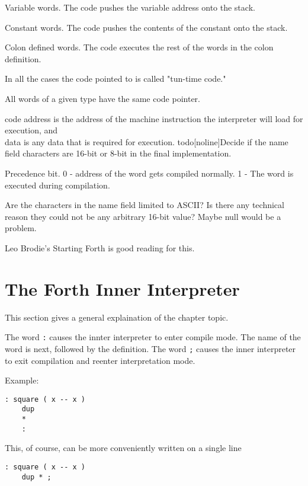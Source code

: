 Variable words. The code pushes the variable address onto the stack.

Constant words. The code pushes the contents of the constant onto the stack.

Colon defined words. The code executes the rest of the words in the colon definition.

In all the cases the code pointed to is called "tun-time code."

All words of a given type have the same code pointer.

code address is the address of the machine instruction the interpreter will load for
execution, and \\
data is any data that is required for execution.
todo[noline]{Decide if the name field characters are 16-bit or 8-bit in the final implementation.}

Precedence bit. 0 - address of the word gets compiled normally. 1 - The word is executed 
during compilation.

Are the characters in the name field limited to ASCII? Is there any technical reason they
could not be any arbitrary 16-bit value? Maybe null would be a problem.

Leo Brodie's Starting Forth is good reading for this.

%
\section{The Forth Inner Interpreter}
This section gives a general explaination 
of the chapter topic.

The word \lstinline|:| causes the innter interpreter to enter compile mode. The name of the
word is next, followed by the definition. The word \lstinline|;| causes the inner
interpreter to exit compilation and reenter interpretation mode.

Example:
\begin{lstlisting}[caption={Definition of \lstinline|dup| in Forth.}]
: square ( x -- x )
    dup
    *
    :
\end{lstlisting}

This, of course, can be more conveniently written on a single line
\begin{lstlisting}[style=kaolstplain,linewidth=1.5\textwidth]
: square ( x -- x )
    dup * ;
\end{lstlisting}

